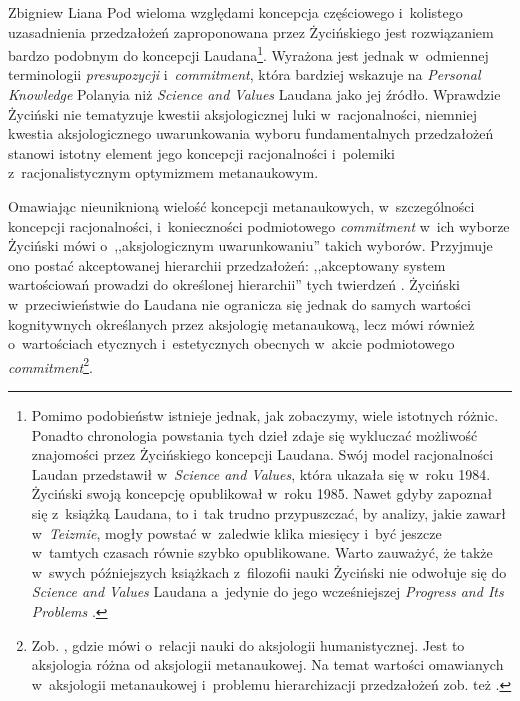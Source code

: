 \begin{artplenv}{Zbigniew Liana}
Pod wieloma względami koncepcja częściowego i~kolistego uzasadnienia przedzałożeń zaproponowana przez Życińskiego jest rozwiązaniem bardzo podobnym do koncepcji Laudana\footnote{Pomimo podobieństw istnieje jednak, jak zobaczymy, wiele istotnych różnic. Ponadto chronologia powstania tych dzieł zdaje się wykluczać możliwość znajomości przez Życińskiego koncepcji Laudana. Swój model racjonalności Laudan przedstawił w~\textit{Science and Values}, która ukazała się w~roku 1984. Życiński swoją koncepcję opublikował w~roku 1985. Nawet gdyby zapoznał się z~książką Laudana, to i~tak trudno przypuszczać, by analizy, jakie zawarł w~\textit{Teizmie}, mogły powstać w~zaledwie klika miesięcy i~być jeszcze w~tamtych czasach równie szybko opublikowane. Warto zauważyć, że także w~swych późniejszych książkach z~filozofii nauki Życiński nie odwołuje się do \textit{Science and Values} Laudana a~jedynie do jego wcześniejszej \textit{Progress and Its Problems}
\parencite*[][]{laudan_progress_1977}.%
}. Wyrażona jest jednak w~odmiennej terminologii \textit{presupozycji} i~\textit{commitment}, która bardziej wskazuje na \textit{Personal Knowledge} Polanyia 
\parencite*[][]{polanyi_personal_1962} %
 niż \textit{Science and Values} Laudana 
\parencite*[][]{laudan_science_1984} %
 jako jej źródło. Wprawdzie Życiński nie tematyzuje kwestii aksjologicznej luki w~racjonalności, niemniej kwestia aksjologicznego uwarunkowania wyboru fundamentalnych przedzałożeń stanowi istotny element jego koncepcji racjonalności i~polemiki z~racjonalistycznym optymizmem metanaukowym.

Omawiając nieuniknioną wielość koncepcji metanaukowych, w~szczególności koncepcji racjonalności, i~konieczności podmiotowego \textit{commitment} w~ich wyborze Życiński mówi o~,,aksjologicznym uwarunkowaniu'' takich wyborów. Przyjmuje ono postać akceptowanej hierarchii przedzałożeń: ,,akceptowany system wartościowań prowadzi do określonej hierarchii'' tych twierdzeń
\parencite[][s.~225]{zycinski_teizm_1985}. %
 Życiński w~przeciwieństwie do Laudana nie ogranicza się jednak do samych wartości kognitywnych określanych przez aksjologię metanaukową, lecz mówi również o~wartościach etycznych i~estetycznych obecnych w~akcie podmiotowego \textit{commitment}\footnote{Zob. 
\parencites[][s.~147–156]{zycinski_structure_1988}[][s.~257–274]{zycinski_struktura_2013_liana}, %
 gdzie mówi o~relacji nauki do aksjologii humanistycznej. Jest to aksjologia różna od aksjologii metanaukowej. Na temat wartości omawianych w~aksjologii metanaukowej i~problemu hierarchizacji przedzałożeń zob. też 
\parencite[][s.~161.169n]{zycinski_teizm_1985}.%
}.


\end{artplenv}
